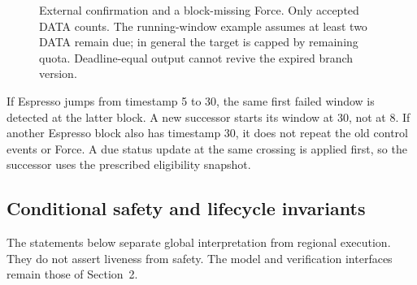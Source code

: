 \documentclass[11pt,a4paper]{article}
\begin{document}
\begin{figure}[htbp]\centering

\caption{External confirmation and a block-missing Force. Only accepted
DATA counts. The running-window example assumes at least two DATA
remain due; in general the target is capped by remaining quota.
Deadline-equal output cannot revive the expired branch version.}
\label{fig:observer-finality}
\end{figure}
\FloatBarrier

If Espresso jumps from timestamp 5 to 30, the same first failed window
is detected at the latter block. A new successor starts its window at
30, not at 8. If another Espresso block also has timestamp 30, it does
not repeat the old control events or Force. A due status update at the
same crossing is applied first, so the successor uses the prescribed
eligibility snapshot.

\subsection{Conditional safety and lifecycle invariants}
\label{sec:safety-argument}
The statements below separate global interpretation from regional
execution. They do not assert liveness from safety. The model and
verification interfaces remain those of Section~2.
\end{document}
